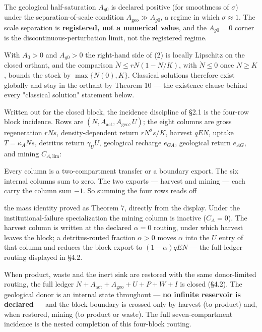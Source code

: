 \documentclass[11pt]{article}
\begin{document}
The geological half-saturation \(A_{g0}\) is declared positive (for smoothness of \(\sigma\)) under the separation-of-scale condition \(A_{\mathrm{geo}}\gg A_{g0}\), a regime in which \(\sigma\approx 1\). The scale separation is \textbf{registered, not a numerical value}, and the \(A_{g0}=0\) corner is the discontinuous-perturbation limit, not the registered regime.

With \(A_0>0\) and \(A_{g0}>0\) the right-hand side of (2) is locally Lipschitz on the closed orthant, and the comparison \(\dot N\le rN(1-N/\allowbreak{}K)\), with \(\dot N\le0\) once \(N\ge K\), bounds the stock by \(\max\{N(0),K\}\). Classical solutions therefore exist globally and stay in the orthant by Theorem 10 --- the existence clause behind every "classical solution" statement below.

Written out for the closed block, the incidence discipline of \S2.1 is the four-row block incidence. Rows are \((N,\allowbreak{}A_{\mathrm{act}},\allowbreak{}A_{\mathrm{geo}},\allowbreak{}U)\); the eight columns are gross regeneration \(rNs\), density-dependent return \(rN^2s/\allowbreak{}K\), harvest \(qEN\), uptake \(T=\kappa_A Ns\), detritus return \(\gamma_U U\), geological recharge \(e_{GA}\), geological return \(e_{AG}\), and mining \(C_{A,\mathrm{lim}}\):

Every column is a two-compartment transfer or a boundary export. The six internal columns sum to zero. The two exports --- harvest and mining --- each carry the column sum \(-1\). So summing the four rows reads off

the mass identity proved as Theorem 7, directly from the display. Under the institutional-failure specialization the mining column is inactive (\(C_A=0\)). The harvest column is written at the declared \(\alpha=0\) routing, under which harvest leaves the block; a detritus-routed fraction \(\alpha>0\) moves \(\alpha\) into the \(U\) entry of that column and reduces the block export to \((1-\alpha)qEN\) --- the full-ledger routing displayed in \S4.2.

When product, waste and the inert sink are restored with the same donor-limited routing, the full ledger \(N+\allowbreak{}A_{\mathrm{act}}+\allowbreak{}A_{\mathrm{geo}}+\allowbreak{}U+\allowbreak{}P+\allowbreak{}W+\allowbreak{}I\) is closed (\S4.2). The geological donor is an internal state throughout --- \textbf{no infinite reservoir is declared} --- and the block boundary is crossed only by harvest (to product) and, when restored, mining (to product or waste). The full seven-compartment incidence is the nested completion of this four-block routing.
\end{document}
